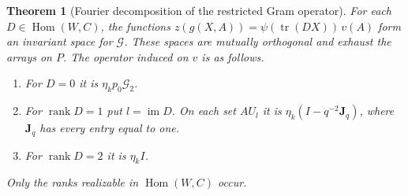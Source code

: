 \documentclass[a4paper,11pt]{article}
\newtheorem{theorem}[proposition]{Theorem}
\theoremstyle{definition}
\theoremstyle{remark}
\numberwithin{equation}{section}
\begin{document}
\begin{theorem}[Fourier decomposition of the restricted Gram operator]
\leavevmode\label{thm:markedfourier625}
For each \(D\in\operatorname{Hom}(W,C)\), the functions
\(z(g(X,A))=\psi(\operatorname{tr}(DX))\,v(A)\) form an
invariant space for \(\mathcal G\). These spaces are mutually
orthogonal and exhaust the arrays on \(P\). The operator induced
on \(v\) is as follows.
\begin{enumerate}
\item[\textup{(i)}] For \(D=0\) it is \(\eta_k p_0\mathcal G_2\).
\item[\textup{(ii)}] For \(\operatorname{rank}D=1\) put \(l=\operatorname{im}D\).
On each set \(A U_l\) it is \(\eta_k(I-q^{-2}\mathbf J_q)\),
where \(\mathbf J_q\) has every entry equal to one.
\item[\textup{(iii)}] For \(\operatorname{rank}D=2\) it is \(\eta_k I\).
\end{enumerate}
Only the ranks realizable in \(\operatorname{Hom}(W,C)\) occur.
\end{theorem}
\end{document}
